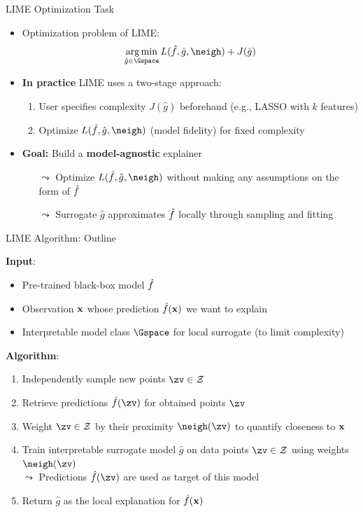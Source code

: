 \documentclass[10pt,compress,t,notes=noshow, xcolor=table]{beamer}
\newcommand{\gh}{\hat{g}}
\begin{document}
\begin{frame}{LIME Optimization Task}
	\begin{itemize}
		\item Optimization problem of LIME: 
		$$ \argmin_{\gh \in \Gspace} L(\fh, \gh, \neigh) + J(\gh)$$
		\item \textbf{In practice} LIME uses a two-stage approach:
		\begin{enumerate}
                \item User specifies complexity $J(\gh)$ beforehand (e.g., LASSO with \( k \) features)
		    \item Optimize $L(\fh, \gh, \neigh)$ (model fidelity) for fixed complexity
		\end{enumerate}
		\item \textbf{Goal:} Build a \textbf{model-agnostic} explainer
		\begin{itemize}
    		\item[$\leadsto$] Optimize $L(\fh, \gh, \neigh)$ without making any assumptions on the form of $\hat{f}$ 
    		\item[$\leadsto$] Surrogate \( \gh \) approximates \( \hat{f} \) locally through sampling and fitting
		\end{itemize}
		\end{itemize}
\end{frame} 

\begin{frame}{LIME Algorithm: Outline }
		
		\textbf{Input}:
		\begin{itemize}
		    \item Pre-trained black-box model $\hat{f}$
		    \item Observation $\mathbf{x}$ whose prediction $\hat{f}(\mathbf{x})$ we want to explain
		    \item Interpretable model class $\Gspace$ for local surrogate (to limit complexity)
		\end{itemize}
		
		\pause
		\medskip
		
		\textbf{Algorithm}:
		\begin{enumerate}
    		\item Independently sample new points $\zv \in \Zspace$ 
    		\item Retrieve predictions $\fh(\zv)$ for obtained points $\zv$ 
    		\item Weight $\zv \in \Zspace$ by their proximity $\neigh(\zv)$ to quantify closeness to \( \mathbf{x} \)
    		\item Train interpretable surrogate model $\gh$ on data points $\zv \in \Zspace$ using weights $\neigh(\zv)$\\ $\leadsto$ Predictions $\fh(\zv)$ are used as target of this model
    		\item Return \( \gh \) as the local explanation for \( \hat{f}(\mathbf{x}) \)
		\end{enumerate}
		

	
\end{frame} 
\end{document}
